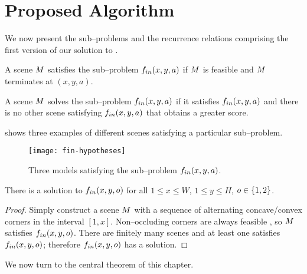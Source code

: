 \section{Proposed Algorithm}

We now present the sub--problems and the recurrence relations
comprising the first version of our solution to .

\begin{definition}
  \label{def:sub-problem-in}
  A scene $\Scene$ satisfies the sub--problem $\SubProbIN(x,y,a)$ if
  $\Scene$ is feasible and $\Scene$ terminates at $(x,y,a)$.

  A scene $\Scene$ solves the sub--problem $\SubProbIN(x,y,a)$ if it
  satisfies $\SubProbIN(x,y,a)$ and there is no other scene satisfying
  $\SubProbIN(x,y,a)$ that obtains a greater score.
\end{definition}

 shows three examples of different scenes
satisfying a particular sub--problem.

\begin{figure}[tb]
  \centering
  \texttt{[image: fin-hypotheses]}
  \caption{Three models satisfying the sub--problem
    $\SubProbIN(x,y,a)$.}
  \label{fig:fin-examples}
\end{figure}

\begin{lemma}
  \label{lemma:solutions-exist}
  There is a solution to $\SubProbIN(x,y,\WallOrient)$ for all $1 \leq x \leq W$,
  $1 \leq y \leq H$, $\WallOrient\in\{1,2\}$.
\end{lemma}
\begin{proof}
  Simply construct a scene $\Scene$ with a sequence of alternating
  concave/convex corners in the interval $[1,x]$. Non--occluding
  corners are always feasible \cite{Lee09}, so $\Scene$ satisfies
  $\SubProbIN(x,y,\WallOrient)$. There are finitely many scenes and at
  least one satisfies $\SubProbIN(x,y,\WallOrient)$; therefore
  $\SubProbIN(x,y,\WallOrient)$ has a solution.
\end{proof}

We now turn to the central theorem of this chapter.


